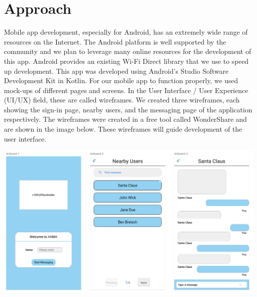 \documentclass[10pt]{article}
\begin{document}

\section{Approach} %

Mobile app development, especially for Android, has an extremely wide range of resources on the Internet. The Android platform is well supported by the community and we plan to leverage many online resources for the development of this app. Android provides an existing Wi-Fi Direct library that we use to speed up development. This app was developed using Android's Studio Software Development Kit in Kotlin. For our mobile app to function properly, we used mock-ups of different pages and screens. In the User Interface / User Experience (UI/UX) field, these are called wireframes. We created three wireframes, each showing the sign-in page, nearby users, and the messaging page of the application respectively. The wireframes were created in a free tool called WonderShare and are shown in the image below. These wireframes will guide development of the user interface.\\

\begin{center}
    \includegraphics[scale=0.5]{wireframe.png} \\
\end{center}
\end{document}
